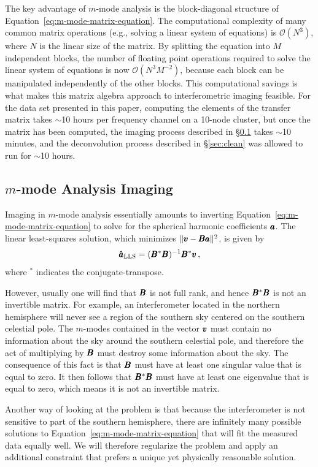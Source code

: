 \begin{bibunit}
The key advantage of $m$-mode analysis is the block-diagonal structure of
Equation~\ref{eq:m-mode-matrix-equation}. The computational complexity of many common matrix
operations (e.g., solving a linear system of equations) is $\mathcal{O}(N^3)$, where $N$ is the
linear size of the matrix.  By splitting the equation into $M$ independent blocks, the number of
floating point operations required to solve the linear system of equations is now
$\mathcal{O}(N^3M^{-2})$, because each block can be manipulated independently of the other blocks.
This computational savings is what makes this matrix algebra approach to interferometric imaging
feasible. For the data set presented in this paper, computing the elements of the transfer matrix
takes $\sim$10 hours per frequency channel on a 10-node cluster, but once the matrix has been
computed, the imaging process described in \S\ref{sec:mmode-imaging} takes $\sim$10 minutes, and the
deconvolution process described in \S\ref{sec:clean} was allowed to run for $\sim$10 hours.

\subsection{$m$-mode Analysis Imaging}\label{sec:mmode-imaging}

Imaging in $m$-mode analysis essentially amounts to inverting
Equation~\ref{eq:m-mode-matrix-equation} to solve for the spherical harmonic coefficients $\pmb a$.
The linear least-squares solution, which minimizes $\|\pmb v - \pmb B\pmb a\|^2$, is given by
\begin{equation}
    \pmb{\hat a}_\text{LLS} = (\pmb B^*\pmb B)^{-1}\pmb B^*\pmb v\,,
\end{equation}
where $^*$ indicates the conjugate-transpose.

However, usually one will find that $\pmb B$ is not full rank, and hence $\pmb B^*\pmb B$ is not an
invertible matrix. For example, an interferometer located in the northern hemisphere will never see
a region of the southern sky centered on the southern celestial pole. The $m$-modes contained in the
vector $\pmb v$ must contain no information about the sky around the southern celestial pole, and
therefore the act of multiplying by $\pmb B$ must destroy some information about the sky. The
consequence of this fact is that $\pmb B$ must have at least one singular value that is equal to zero.
It then follows that $\pmb B^*\pmb B$ must have at least one eigenvalue that is equal to zero, which
means it is not an invertible matrix.

Another way of looking at the problem is that because the interferometer is not sensitive to part of
the southern hemisphere, there are infinitely many possible solutions to
Equation~\ref{eq:m-mode-matrix-equation} that will fit the measured data equally well.  We will
therefore regularize the problem and apply an additional constraint that prefers a unique yet
physically reasonable solution.


\end{bibunit}
